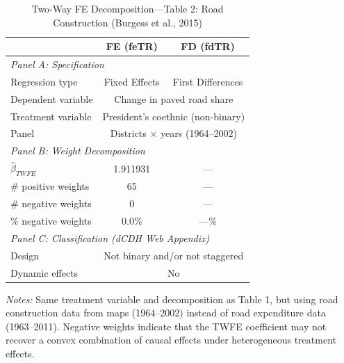 \begin{table}[htbp]
\centering
\caption{Two-Way FE Decomposition---Table 2: Road Construction (Burgess et al., 2015)}
\label{tab:burgess_twfe_t2}
\begin{tabular}{lcc}
\toprule
 & FE (feTR) & FD (fdTR) \\
\midrule
\multicolumn{3}{l}{\textit{Panel A: Specification}} \\[3pt]
Regression type & Fixed Effects & First Differences \\
Dependent variable & \multicolumn{2}{c}{Change in paved road share} \\
Treatment variable & \multicolumn{2}{c}{President's coethnic (non-binary)} \\
Panel & \multicolumn{2}{c}{Districts $\times$ years (1964--2002)} \\[6pt]
\multicolumn{3}{l}{\textit{Panel B: Weight Decomposition}} \\[3pt]
$\hat{\beta}_{TWFE}$ & 1.911931 & --- \\
\# positive weights & 65 & --- \\
\# negative weights & 0 & --- \\
\% negative weights &   0.0\% & ---\% \\[6pt]
\multicolumn{3}{l}{\textit{Panel C: Classification (dCDH Web Appendix)}} \\[3pt]
Design & \multicolumn{2}{c}{Not binary and/or not staggered} \\
Dynamic effects & \multicolumn{2}{c}{No} \\
\bottomrule
\end{tabular}

\vspace{6pt}
\begin{minipage}{0.92\textwidth}
\footnotesize
\textit{Notes:} Same treatment variable and decomposition as Table 1, 
but using road construction data from maps (1964--2002) instead of 
road expenditure data (1963--2011). 
Negative weights indicate that the TWFE coefficient may not recover 
a convex combination of causal effects under heterogeneous treatment effects.
\end{minipage}
\end{table}
